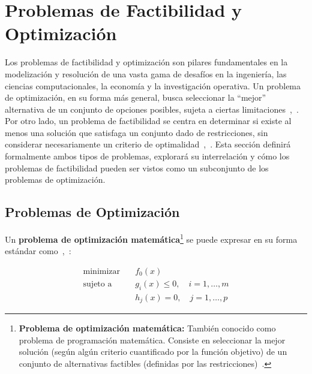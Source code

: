 \section{Problemas de Factibilidad y Optimización}\label{sec:main_fact_opt}

Los problemas de factibilidad y optimización son pilares fundamentales en la modelización y resolución de una
vasta gama de desafíos en la ingeniería, las ciencias computacionales, la economía y la investigación operativa.
Un problema de optimización, en su forma más general, busca seleccionar la ``mejor'' alternativa de un conjunto
de opciones posibles, sujeta a ciertas limitaciones~\cite[p.~1]{BoydVandenberghe2004},~\cite[p.~4]{BoydVandenbergheSlides2023}. Por otro lado, un problema de factibilidad se centra en determinar
si existe al menos una solución que satisfaga un conjunto dado de restricciones, sin considerar necesariamente
un criterio de optimalidad~\cite[p.~130]{BoydVandenberghe2004},~\cite[p.~1]{Sidford2020}. Esta sección definirá
formalmente ambos tipos de problemas, explorará su interrelación y cómo los problemas de factibilidad pueden
ser vistos como un subconjunto de los problemas de optimización.

\subsection{Problemas de Optimización}\label{sec:opt_problems}

Un \textbf{problema de optimización matemática}\footnote{\textbf{Problema de optimización matemática:}
También conocido como problema de programación matemática. Consiste en seleccionar la mejor solución
(según algún criterio cuantificado por la función objetivo) de un conjunto de alternativas factibles
(definidas por las restricciones)~\cite[p.~1]{BoydVandenberghe2004}.} se puede expresar en su forma
estándar como~\cite[p.~127]{BoydVandenberghe2004},~\cite[p.~89]{BoydVandenbergheSlides2023}:

\begin{align}
  \text{minimizar} \quad & f_0(x) \\
  \text{sujeto a} \quad & g_i(x) \leq 0, \quad i = 1, \dots, m \\
                      & h_j(x) = 0,    \quad j = 1, \dots, p
\end{align}

